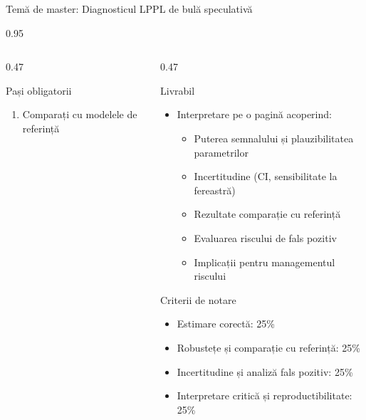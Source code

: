 \documentclass[9pt, aspectratio=169, t]{beamer}
\begin{document}
\begin{frame}{Temă de master: Diagnosticul LPPL de bulă speculativă}
\begin{cminipage}{0.95\textwidth}
{\begin{columns}[T]
\begin{column}{0.47\textwidth}
\begin{exampleblock}{Pași obligatorii}
\begin{enumerate}
                    \item Comparați cu modelele de referință
                \end{enumerate}
            \end{exampleblock}
        \end{column}
        \begin{column}{0.47\textwidth}
            \begin{alertblock}{Livrabil}
                \begin{itemize}\setlength{\itemsep}{0pt}
                    \item Interpretare pe o pagină acoperind:
                    \begin{itemize}\setlength{\itemsep}{0pt}
                        \item Puterea semnalului și plauzibilitatea parametrilor
                        \item Incertitudine (CI, sensibilitate la fereastră)
                        \item Rezultate comparație cu referință
                        \item Evaluarea riscului de fals pozitiv
                        \item Implicații pentru managementul riscului
                    \end{itemize}
                \end{itemize}
            \end{alertblock}
            \vspace{-2mm}
            \begin{block}{Criterii de notare}
                \begin{itemize}\setlength{\itemsep}{0pt}
                    \item Estimare corectă: 25\%
                    \item Robustețe și comparație cu referință: 25\%
                    \item Incertitudine și analiză fals pozitiv: 25\%
                    \item Interpretare critică și reproductibilitate: 25\%
                \end{itemize}
            \end{block}
        \end{column}
    \end{columns}
    }
    \end{cminipage}
\end{frame}
\end{document}
